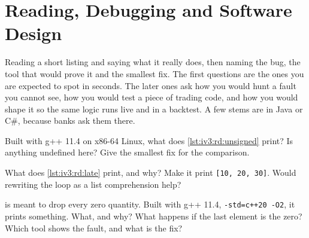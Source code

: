 \chapter{Reading, Debugging and Software Design}\label{ch:iv3:reading-debugging-and-software-design}

\begin{ivtrains}
Reading a short listing and saying what it really does, then naming the bug, the tool that would prove it and the smallest fix. The first questions are the ones you are expected to spot in seconds. The later ones ask how you would hunt a fault you cannot see, how you would test a piece of trading code, and how you would shape it so the same logic runs live and in a backtest. A few stems are in Java or C\#, because banks ask them there.
\end{ivtrains}

\begin{question}\label{iq:iv3:reading-debugging-and-software-design:1}
Built with g++ 11.4 on x86-64 Linux, what does \cref{lst:iv3:rd:unsigned} print? Is anything undefined here? Give the smallest fix for the comparison.
\label{lst:iv3:rd:unsigned}
\end{question}

\begin{question}\label{iq:iv3:reading-debugging-and-software-design:2}
What does \cref{lst:iv3:rd:late} print, and why? Make it print \texttt{[10, 20, 30]}. Would rewriting the loop as a list comprehension help?
\label{lst:iv3:rd:late}
\end{question}

\begin{question}\label{iq:iv3:reading-debugging-and-software-design:3}
 is meant to drop every zero quantity. Built with g++ 11.4, \texttt{-std=c++20 -O2}, it prints something. What, and why? What happens if the last element is the zero? Which tool shows the fault, and what is the fix?
\label{lst:iv3:rd:erase}
\end{question}

